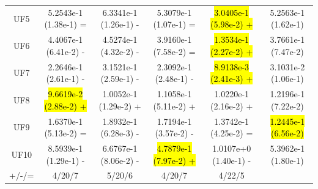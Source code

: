 \documentclass[journal]{IEEEtran}
\begin{document}
\begin{table}[]
\begin{tabular}{cccccc}
    UF5     & 5.2543e-1 (1.38e-1) =      & 6.3341e-1 (1.26e-1) -      & 5.3079e-1 (1.07e-1) =      & \hl{3.0405e-1 (5.98e-2) +} & 5.2563e-1 (1.62e-1)      \\
    UF6     & 4.4067e-1 (6.41e-2) -      & 4.5274e-1 (4.32e-2) -      & 3.9160e-1 (7.58e-2) =      & \hl{1.3534e-1 (2.27e-2) +} & 3.7661e-1 (7.47e-2)      \\
    UF7     & 2.2646e-1 (2.61e-1) -      & 3.1521e-1 (2.59e-1) -      & 2.3092e-1 (2.48e-1) -      & \hl{8.9138e-3 (2.41e-3) +} & 3.1031e-2 (1.06e-1)      \\
    UF8     & \hl{9.6619e-2 (2.88e-2) +} & 1.0052e-1 (1.29e-2) +      & 1.1058e-1 (5.11e-2) +      & 1.0220e-1 (2.16e-2) +      & 1.2196e-1 (7.22e-2)      \\
    UF9     & 1.6370e-1 (5.13e-2) =      & 1.8932e-1 (6.28e-3) -      & 1.7194e-1 (3.57e-2) -      & 1.3742e-1 (4.25e-2) =      & \hl{1.2445e-1 (6.56e-2)} \\
    UF10    & 8.5939e-1 (1.29e-1) -      & 6.6767e-1 (8.06e-2) -      & \hl{4.7879e-1 (7.97e-2) +} & 1.0107e+0 (1.40e-1) -      & 5.3962e-1 (1.80e-1)      \\
    \hline
    +/-/=   & 4/20/7                     & 5/20/6                     & 4/20/7                     & 4/22/5                     &                          \\
    \bottomrule
  \end{tabular}
  \label{tab:igd_all}
\end{table}
\end{document}
